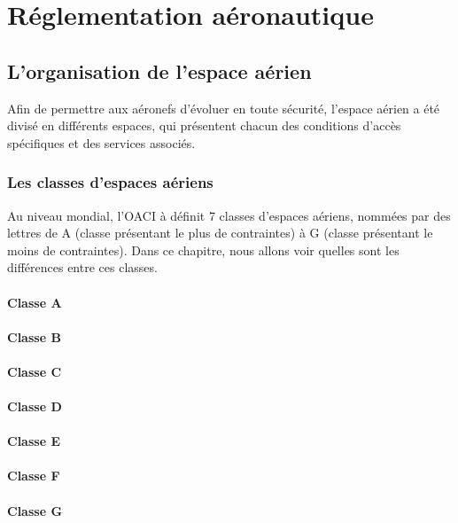 \section{Réglementation aéronautique}
	\subsection{L'organisation de l'espace aérien}
	Afin de permettre aux aéronefs d'évoluer en toute sécurité, l'espace aérien a été divisé en différents espaces, qui présentent chacun des conditions d'accès spécifiques et des services associés.
		
		\subsubsection{Les classes d'espaces aériens}
		Au niveau mondial, l'OACI à définit 7 classes d'espaces aériens, nommées par des lettres de A (classe présentant le plus de contraintes) à G (classe présentant le moins de contraintes). Dans ce chapitre, nous allons voir quelles sont les différences entre ces classes.
		
		\paragraph{Classe A}
		
		\paragraph{Classe B}
		
		\paragraph{Classe C}
		
		\paragraph{Classe D}\label{classeD}
		
		\paragraph{Classe E}
		
		\paragraph{Classe F}
		
		\paragraph{Classe G}
		
